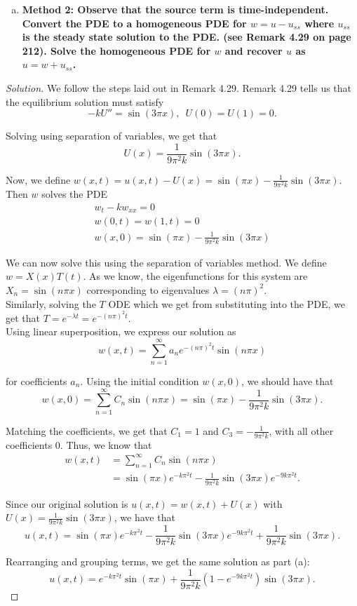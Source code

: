 \documentclass[11pt]{article}
\newenvironment{solution}
  {\renewcommand\qedsymbol{$\blacksquare$}\begin{proof}[Solution]}
  {\end{proof}}
\begin{document}
\begin{enumerate}[(b)]
    \item \textbf{Method 2: Observe that the source term is time-independent. Convert the PDE to a homogeneous PDE for $w = u - u_{ss}$ where $u_{ss}$ is the steady state solution to the PDE.
    (see Remark 4.29 on page 212). Solve the homogeneous PDE for $w$ and recover $u$ as $u = w + u_{ss}$.}
\end{enumerate}

\begin{solution}
We follow the steps laid out in Remark 4.29. Remark 4.29 tells us that the equilibrium solution must satisfy
\[ -kU'' = \sin(3\pi x), \, \, \, U(0) = U(1) = 0.\]

Solving using separation of variables, we get that \[U(x) = \frac{1}{9\pi^2 k}\sin(3\pi x).\]

Now, we define $w(x, t) = u(x, t) - U(x) = \sin(\pi x) - \frac{1}{9\pi^2 k} \sin(3\pi x).$ Then $w$ solves the PDE
\[
\begin{array}{c}
w_t - kw_{xx} = 0 \\
w(0, t) = w(1, t) = 0 \\
w(x, 0) = \sin(\pi x) - \frac{1}{9\pi^2 k} \sin(3\pi x)
\end{array}
\]

We can now solve this using the separation of variables method. We define $w = X(x)T(t)$. As we know, the eigenfunctions for this system are $X_n = \sin(n\pi x)$ corresponding to eigenvalues $\lambda = (n\pi)^2$. \\

Similarly, solving the $T$ ODE which we get from substituting into the PDE, we get that $T=e^{-\lambda t} = e^{-(n\pi)^2t}.$ \\

Using linear superposition, we express our solution as \[ w(x, t) = \sum\limits_{n=1}^{\infty} a_n e^{-(n\pi)^2 t} \sin(n\pi x)\]

for coefficients $a_n$. Using the initial condition $w(x, 0)$, we should have that
\[ w(x, 0) = \sum\limits_{n=1}^{\infty} C_n \sin(n\pi x) = \sin(\pi x) - \frac{1}{9\pi^2 k} \sin(3\pi x). \]

Matching the coefficients, we get that $C_1 = 1$ and $C_3 = -\frac{1}{9\pi^2k}$, with all other coefficients $0$. Thus, we know that 
\begin{align*} w(x, t) &= \sum\limits_{n=1}^{\infty} C_n \sin(n\pi x) \\
    &= \sin(\pi x)e^{-k\pi^2 t} -\frac{1}{9\pi^2 k} \sin(3\pi x) e^{-9k\pi^2 t}.
\end{align*}

Since our original solution is $u(x, t) = w(x, t) + U(x)$ with $U(x) = \frac{1}{9\pi^2 k} \sin(3\pi x)$, we have that
\[ u(x, t) = \sin(\pi x)e^{-k\pi^2 t} -\frac{1}{9\pi^2 k} \sin(3\pi x) e^{-9k\pi^2 t} + \frac{1}{9\pi^2 k} \sin(3\pi x).\]

Rearranging and grouping terms, we get the same solution as part (a):
\[ \boxed{u(x, t) = e^{-k\pi^2 t}\sin(\pi x) + \frac{1}{9\pi^2k}\left(1 - e^{-9k\pi^2t}\right) \sin(3\pi x)}.\]

\end{solution} 
\newpage
\end{document}
